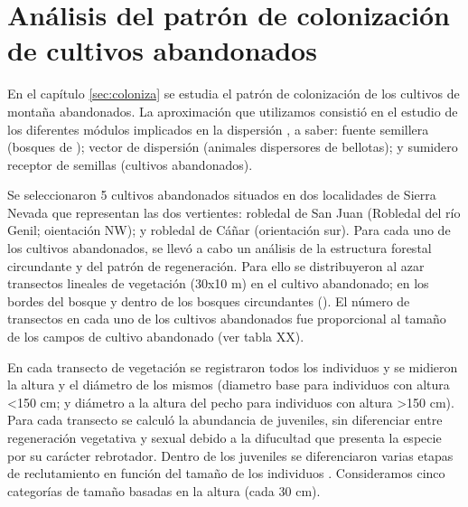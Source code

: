 \section{Análisis del patrón de colonización de cultivos abandonados}\label{sec:metodologia:coloniza}

En el capítulo \ref{sec:coloniza} se estudia el patrón de colonización de los cultivos de montaña abandonados. La aproximación que utilizamos consistió en el estudio de los diferentes módulos implicados en la dispersión \autocite[][]{LundbergMoberg2003MobileLink,Nathanetal2012DispersalKernels}, a saber: fuente semillera (bosques de \Qpy); vector de dispersión (animales dispersores de bellotas); y  sumidero receptor de semillas (cultivos abandonados).

Se seleccionaron 5 cultivos abandonados situados en dos localidades de Sierra Nevada que representan las dos vertientes: robledal de San Juan (Robledal del río Genil; oientación NW); y robledal de Cáñar (orientación sur). Para cada uno de los cultivos abandonados, se llevó a cabo un análisis de la estructura forestal circundante y del patrón de regeneración. Para ello se  distribuyeron al azar transectos lineales de vegetación (30x10 m) en el cultivo abandonado; en los bordes del bosque y dentro de los bosques circundantes (). El número de transectos en cada uno de los cultivos abandonados fue proporcional al tamaño de los campos de cultivo abandonado (ver tabla XX). 

En cada transecto de vegetación se registraron todos los individuos y se midieron la altura y el diámetro de los mismos (diametro base para individuos con altura \textless 150 cm; y diámetro a la altura del pecho para individuos con altura \textgreater 150 cm). Para cada transecto se calculó la abundancia de juveniles, sin diferenciar entre regeneración vegetativa y sexual debido a la difucultad que presenta la especie por su carácter rebrotador. Dentro de los juveniles se diferenciaron varias etapas de reclutamiento en función del tamaño de los individuos \autocite[\emph{e.g.}][]{Plieningeretal2010LargeScalePatterns}. Consideramos cinco categorías de tamaño basadas en la altura (cada 30 cm). 

